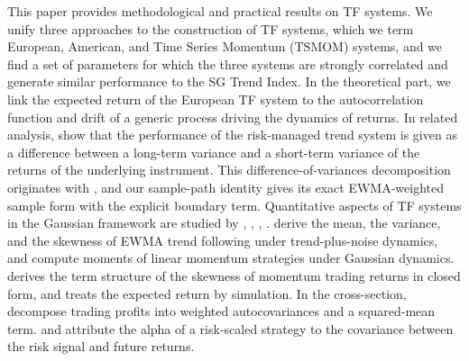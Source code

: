 \documentclass[hidelinks]{siamonline250211}
\begin{document}
This paper provides methodological and practical results on TF systems. We unify three approaches to the construction of TF systems, which we term European, American, and Time Series Momentum (TSMOM) systems, and we find a set of parameters for which the three systems are strongly correlated and generate similar performance to the SG Trend Index. In the theoretical part, we link the expected return of the European TF system to the autocorrelation function and drift of a generic process driving the dynamics of returns. In related analysis, \cite{Bouchaud2017} show that the performance of the risk-managed trend system is given as a difference between a long-term variance and a short-term variance of the returns of the underlying instrument. This difference-of-variances decomposition originates with \cite{BruderGaussel2011}, and our sample-path identity gives its exact EWMA-weighted sample form with the explicit boundary term. Quantitative aspects of TF systems in the Gaussian framework are studied by \cite{Grebenkov2014}, \cite{Ferreira2018}, \cite{Zakamulin2020}, \cite{Valeyre2025}. \cite{Jusselin2017} derive the mean, the variance, and the skewness of EWMA trend following under trend-plus-noise dynamics, and \cite{Martin2012} compute moments of linear momentum strategies under Gaussian dynamics. \cite{Martin2023} derives the term structure of the skewness of momentum trading returns in closed form, and treats the expected return by simulation. In the cross-section, \cite{LoMacKinlay1990} decompose trading profits into weighted autocovariances and a squared-mean term. \cite{GouldingHarveyMazzoleni2023} and \cite{MoreiraMuir2017} attribute the alpha of a risk-scaled strategy to the covariance between the risk signal and future returns.
\end{document}
